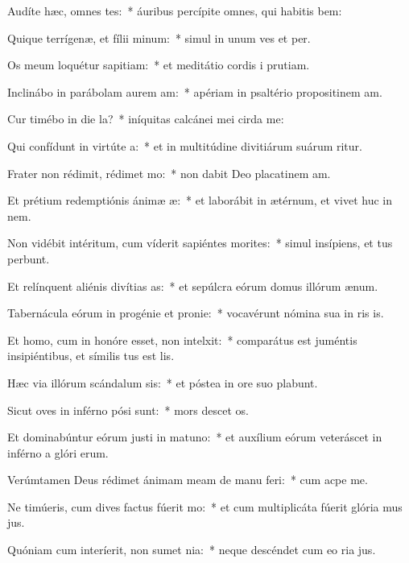 \item Audíte hæc, omnes tes:~* áuribus percípite omnes, qui habitis bem:
\item Quique terrígenæ, et fílii minum:~* simul in unum ves et per.
\item Os meum loquétur sapitiam:~* et meditátio cordis i prutiam.
\item Inclinábo in parábolam aurem am:~* apériam in psaltério propositinem am.
\item Cur timébo in die la?~* iníquitas calcánei mei cirda me:
\item Qui confídunt in virtúte a:~* et in multitúdine divitiárum suárum ritur.
\item Frater non rédimit, rédimet mo:~* non dabit Deo placatinem am.
\item Et prétium redemptiónis ánimæ æ:~* et laborábit in ætérnum, et vivet huc in nem.
\item Non vidébit intéritum, cum víderit sapiéntes morites:~* simul insípiens, et tus perbunt.
\item Et relínquent aliénis divítias as:~* et sepúlcra eórum domus illórum  ænum.
\item Tabernácula eórum in progénie et pronie:~* vocavérunt nómina sua in ris is.
\item Et homo, cum in honóre esset, non intelxit:~* comparátus est juméntis insipiéntibus, et símilis tus est lis.
\item Hæc via illórum scándalum sis:~* et póstea in ore suo plabunt.
\item Sicut oves in inférno pósi sunt:~* mors descet os.
\item Et dominabúntur eórum justi in matuno:~* et auxílium eórum veteráscet in inférno a glóri erum.
\item Verúmtamen Deus rédimet ánimam meam de manu feri:~* cum acpe me.
\item Ne timúeris, cum dives factus fúerit mo:~* et cum multiplicáta fúerit glória mus jus.
\item Quóniam cum interíerit, non sumet nia:~* neque descéndet cum eo ria jus.
